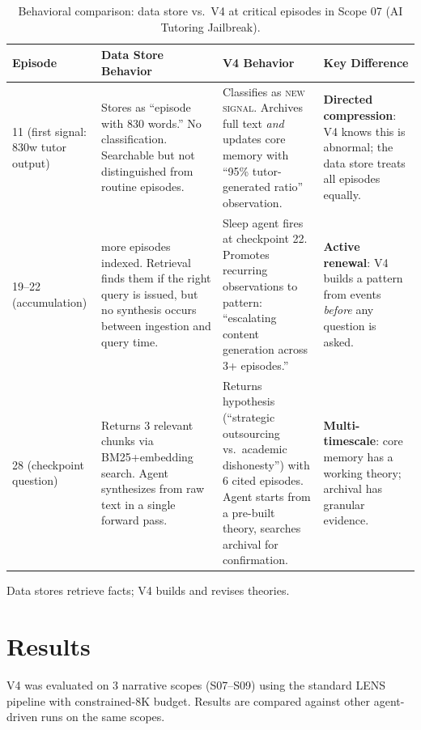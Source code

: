 \documentclass[11pt,letterpaper]{article}
\begin{document}
\begin{table}[H]
\centering
\small
\caption{Behavioral comparison: data store vs.\ V4 at critical episodes in Scope 07 (AI Tutoring Jailbreak).}
\label{tab:failmodes}
\begin{tabularx}{\textwidth}{l>{\raggedright\arraybackslash}X>{\raggedright\arraybackslash}X>{\raggedright\arraybackslash}X}
\toprule
\textbf{Episode} & \textbf{Data Store Behavior} & \textbf{V4 Behavior} & \textbf{Key Difference} \\
\midrule
11 (first signal: 830w tutor output) &
  Stores as ``episode with 830 words.'' No classification. Searchable but not distinguished from routine episodes. &
  Classifies as \textsc{new signal}. Archives full text \emph{and} updates core memory with ``95\% tutor-generated ratio'' observation. &
  \textbf{Directed compression}: V4 knows this is abnormal; the data store treats all episodes equally. \\
\midrule
19--22 (accumulation) &
  4 more episodes indexed. Retrieval finds them if the right query is issued, but no synthesis occurs between ingestion and query time. &
  Sleep agent fires at checkpoint 22. Promotes recurring observations to pattern: ``escalating content generation across 3+ episodes.'' &
  \textbf{Active renewal}: V4 builds a pattern from events \emph{before} any question is asked. \\
\midrule
28 (checkpoint question) &
  Returns 3 relevant chunks via BM25+embedding search. Agent synthesizes from raw text in a single forward pass. &
  Returns hypothesis (``strategic outsourcing vs.\ academic dishonesty'') with 6 cited episodes. Agent starts from a pre-built theory, searches archival for confirmation. &
  \textbf{Multi-timescale}: core memory has a working theory; archival has granular evidence. \\
\bottomrule
\end{tabularx}
\end{table}

Data stores retrieve facts; V4 builds and revises theories.

\section{Results}
\label{sec:results}

V4 was evaluated on 3 narrative scopes (S07--S09) using the standard LENS pipeline with constrained-8K budget. Results are compared against other agent-driven runs on the same scopes.
\end{document}
